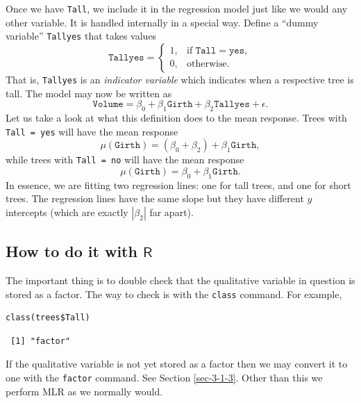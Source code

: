 \documentclass[captions=tableheading]{scrbook}
\begin{document}
Once we have \texttt{Tall}, we include it in the regression model just like we would any other variable. It is handled internally in a special way. Define a ``dummy variable'' \texttt{Tallyes} that takes values
\begin{equation}
\mathtt{Tallyes}=
\begin{cases}
1, & \mbox{if }\mathtt{Tall}=\mathtt{yes},\\
0, & \mbox{otherwise.}
\end{cases}
\end{equation}
That is, \texttt{Tallyes} is an \emph{indicator variable} which indicates when a respective tree is tall. The model may now be written as 
\begin{equation}
\mathtt{Volume}=\beta_{0}+\beta_{1}\mathtt{Girth}+\beta_{2}\mathtt{Tallyes}+\epsilon.
\end{equation}
Let us take a look at what this definition does to the mean response. Trees with \texttt{Tall = yes} will have the mean response
\begin{equation}
\mu(\mathtt{Girth})=(\beta_{0}+\beta_{2})+\beta_{1}\mathtt{Girth},
\end{equation}
while trees with \texttt{Tall = no} will have the mean response
\begin{equation} 
\mu(\mathtt{Girth})=\beta_{0}+\beta_{1}\mathtt{Girth}.
\end{equation}
In essence, we are fitting two regression lines: one for tall trees, and one for short trees. The regression lines have the same slope but they have different \(y\) intercepts (which are exactly \(|\beta_{2}|\) far apart).
\subsection{How to do it with \(\mathsf{R}\)}
\label{sec-12-6-1}


The important thing is to double check that the qualitative variable in question is stored as a factor. The way to check is with the \texttt{class} command. For example,


\begin{verbatim}
class(trees$Tall)
\end{verbatim}

\begin{verbatim}
 [1] "factor"
\end{verbatim}

If the qualitative variable is not yet stored as a factor then we may convert it to one with the \texttt{factor} command. See Section \ref{sec-3-1-3}. Other than this we perform MLR as we normally would.
\end{document}
